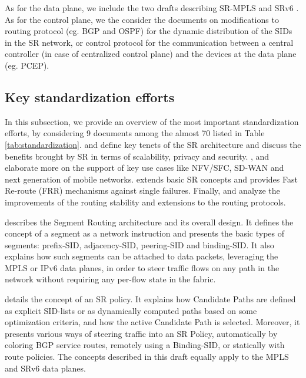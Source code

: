 As for the data plane, we include the two drafts describing SR-MPLS \cite{id-segment-routing-mpls} and SRv6 \cite{ietf-6man-segment-routing-header}.
As for the control plane, we the consider the documents on modifications to routing protocol (eg. BGP and OSPF) for the dynamic distribution of the SIDs in the SR network, or control protocol for the communication between a central controller (in case of centralized control plane) and the devices at the data plane (eg. PCEP).


\subsection{Key standardization efforts}
\label{sec:key_standard}

In this subsection, we provide an overview of the most important standardization efforts, by considering 9 documents among the almost 70 listed in Table \ref{tab:standardization}. \cite{rfc8402} and \cite{id-segment-routing-policy} define key tenets of the SR architecture and discuss the benefits brought by SR in terms of scalability, privacy and security. \cite{id-sr-service-programming}, \cite{id-sr-for-sdwan} and  \cite{id-srv6-mobile-uplane} elaborate more on the support of key use cases like NFV/SFC, SD-WAN and next generation of mobile networks. \cite{id-srv6-network-prog} extends basic SR concepts and \cite{id-segment-routing-ti-lfa} provides Fast Re-route (FRR) mechanisms against single failures. Finally,  
\cite{id-segment-routing-uloop} and \cite{ietf-lsr-flex-algo} analyze the improvements of the routing stability and extensions to the routing protocols.

\cite{rfc8402} describes the Segment Routing architecture and its overall design. It defines the concept of a segment as a network instruction and presents the basic types of segments: prefix-SID, adjacency-SID, peering-SID and binding-SID. It also explains how such segments can be attached to data packets, leveraging the MPLS or IPv6 data planes, in order to steer traffic flows on any path in the network without requiring any per-flow state in the fabric.

\cite{id-segment-routing-policy} details the concept of an SR policy. It explains how Candidate Paths are defined as explicit SID-lists or as dynamically computed paths based on some optimization criteria, and how the active Candidate Path is selected. Moreover, it presents various ways of steering traffic into an SR Policy, automatically by coloring BGP service routes, remotely using a Binding-SID, or statically with route policies. The concepts described in this draft equally apply to the MPLS and SRv6 data planes.

